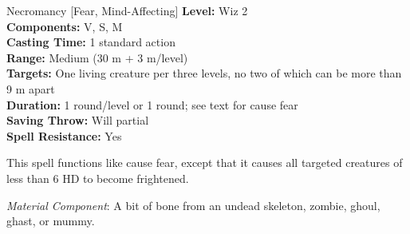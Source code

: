 {Necromancy [Fear, Mind-Affecting]}
{
	\textbf{Level:}
	Wiz 2\\
	\textbf{Components:}
	V, S, M\\
	\textbf{Casting Time:}
	1 standard action\\
	\textbf{Range:}
	Medium (30 m + 3 m/level)\\
	\textbf{Targets:}
	One living creature per three levels, no two of which can be more than 9 m apart\\
	\textbf{Duration:}
	1 round/level or 1 round; see text for cause fear\\
	\textbf{Saving Throw:}
	Will partial\\
	\textbf{Spell Resistance:}
	Yes\\
}
{
	This spell functions like cause fear, except that it causes all targeted creatures of less than 6 HD to become frightened.

	\textit{Material Component}:
	A bit of bone from an undead skeleton, zombie, ghoul, ghast, or mummy.

}

